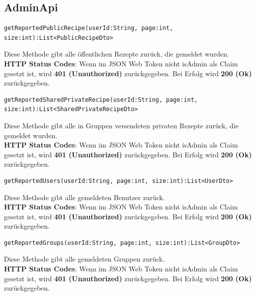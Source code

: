 \subsection{AdminApi}
\vspace{1cm}
 \begin{lstlisting}
getReportedPublicRecipe(userId:String, page:int, size:int):List<PublicRecipeDto>
\end{lstlisting}
Diese Methode gibt alle öffentlichen Rezepte zurück, die gemeldet wurden.\\
\textbf{HTTP Status Codes}:
Wenn im JSON Web Token nicht isAdmin als Claim gesetzt ist, wird \textbf{401 (Unauthorized)} zurückgegeben. Bei Erfolg wird \textbf{200 (Ok)} zurückgegeben.
\vspace{1cm}
\begin{lstlisting}
getReportedSharedPrivateRecipe(userId:String, page:int, size:int):List<SharedPrivateRecipeDto>
\end{lstlisting}
Diese Methode gibt alle in Gruppen versendeten privaten Rezepte zurück, die gemeldet wurden.\\
\textbf{HTTP Status Codes}:
Wenn im JSON Web Token nicht isAdmin als Claim gesetzt ist, wird \textbf{401 (Unauthorized)} zurückgegeben. Bei Erfolg wird \textbf{200 (Ok)} zurückgegeben.
\vspace{1cm}  
 \begin{lstlisting}
getReportedUsers(userId:String, page:int, size:int):List<UserDto>
\end{lstlisting}
Diese Methode gibt alle gemeldeten Benutzer zurück.\\
\textbf{HTTP Status Codes}:
Wenn im JSON Web Token nicht isAdmin als Claim gesetzt ist, wird \textbf{401 (Unauthorized)} zurückgegeben. Bei Erfolg wird \textbf{200 (Ok)} zurückgegeben.
\vspace{1cm}  
 \begin{lstlisting}
getReportedGroups(userId:String, page:int, size:int):List<GroupDto>
\end{lstlisting}
Diese Methode gibt alle gemeldeten Gruppen zurück.\\
\textbf{HTTP Status Codes}:
Wenn im JSON Web Token nicht isAdmin als Claim gesetzt ist, wird \textbf{401 (Unauthorized)} zurückgegeben. Bei Erfolg wird \textbf{200 (Ok)} zurückgegeben.
\vspace{1cm}
